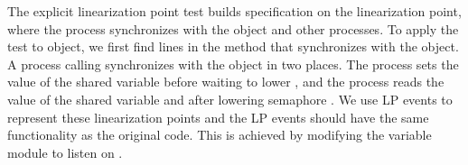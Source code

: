 \documentclass{article}
\begin{document}
The explicit linearization point test builds specification on the linearization point, where the process synchronizes with the object and other processes. To apply the test to  object, we first find lines in the method that synchronizes with the object. A process calling  synchronizes with the object in two places. The process sets the value of the shared variable  before waiting to lower , and the process reads the value of the shared variable  and  after lowering semaphore . We use LP events to represent these linearization points and the LP events should have the same functionality as the original code. This is achieved by modifying the variable module to listen on .


    
\end{document}
